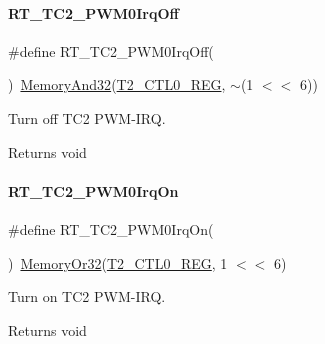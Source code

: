 \paragraph{\texorpdfstring{R\+T\+\_\+\+T\+C2\+\_\+\+P\+W\+M0\+Irq\+Off}{RT\_TC2\_PWM0IrqOff}}
{\footnotesize\ttfamily \#define R\+T\+\_\+\+T\+C2\+\_\+\+P\+W\+M0\+Irq\+Off(\begin{DoxyParamCaption}{ }\end{DoxyParamCaption})~\mbox{\hyperlink{a00020_ad87cedffcaadc51db22594fce55173d4}{Memory\+And32}}(\mbox{\hyperlink{a00020_adadaa0ab1ebbd7ba9b70dfd24c3ed44daf2e9deb36631241181cbf09e8d959475}{T2\+\_\+\+C\+T\+L0\+\_\+\+R\+EG}}, $\sim$(1 $<$$<$ 6))}



Turn off T\+C2 P\+W\+M-\/\+I\+RQ. 

\begin{DoxyReturn}{Returns}
void 
\end{DoxyReturn}
\mbox{\label{a00047_a20ca153421087b763d5a1bcec1f90d55}} 
\paragraph{\texorpdfstring{R\+T\+\_\+\+T\+C2\+\_\+\+P\+W\+M0\+Irq\+On}{RT\_TC2\_PWM0IrqOn}}
{\footnotesize\ttfamily \#define R\+T\+\_\+\+T\+C2\+\_\+\+P\+W\+M0\+Irq\+On(\begin{DoxyParamCaption}{ }\end{DoxyParamCaption})~\mbox{\hyperlink{a00020_a27874a97deab7cecdde5ddecf466e31e}{Memory\+Or32}}(\mbox{\hyperlink{a00020_adadaa0ab1ebbd7ba9b70dfd24c3ed44daf2e9deb36631241181cbf09e8d959475}{T2\+\_\+\+C\+T\+L0\+\_\+\+R\+EG}}, 1 $<$$<$ 6)}



Turn on T\+C2 P\+W\+M-\/\+I\+RQ. 

\begin{DoxyReturn}{Returns}
void 
\end{DoxyReturn}
\mbox{\label{a00047_a52f984fc9f5bc4d1821025ad8d75f3c9}} 
